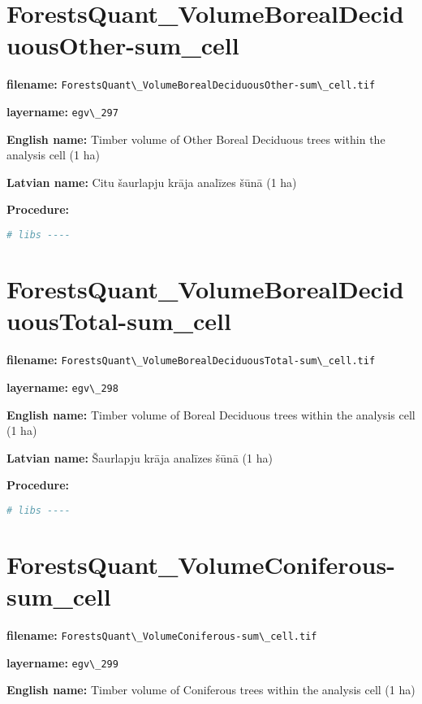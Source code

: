 \documentclass[
]{book}
\newcommand{\passthrough}[1]{#1}
\begin{document}
\section{ForestsQuant\_VolumeBorealDeciduousOther-sum\_cell}\label{ch06.297}

\textbf{filename:} \passthrough{\lstinline!ForestsQuant\_VolumeBorealDeciduousOther-sum\_cell.tif!}

\textbf{layername:} \passthrough{\lstinline!egv\_297!}

\textbf{English name:} Timber volume of Other Boreal Deciduous trees within the analysis cell (1 ha)

\textbf{Latvian name:} Citu šaurlapju krāja analīzes šūnā (1 ha)

\textbf{Procedure:}

\begin{lstlisting}[language=R]
# libs ----
\end{lstlisting}

\section{ForestsQuant\_VolumeBorealDeciduousTotal-sum\_cell}\label{ch06.298}

\textbf{filename:} \passthrough{\lstinline!ForestsQuant\_VolumeBorealDeciduousTotal-sum\_cell.tif!}

\textbf{layername:} \passthrough{\lstinline!egv\_298!}

\textbf{English name:} Timber volume of Boreal Deciduous trees within the analysis cell (1 ha)

\textbf{Latvian name:} Šaurlapju krāja analīzes šūnā (1 ha)

\textbf{Procedure:}

\begin{lstlisting}[language=R]
# libs ----
\end{lstlisting}

\section{ForestsQuant\_VolumeConiferous-sum\_cell}\label{ch06.299}

\textbf{filename:} \passthrough{\lstinline!ForestsQuant\_VolumeConiferous-sum\_cell.tif!}

\textbf{layername:} \passthrough{\lstinline!egv\_299!}

\textbf{English name:} Timber volume of Coniferous trees within the analysis cell (1 ha)
\end{document}
